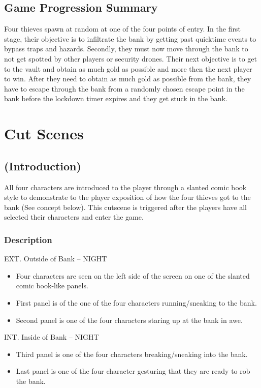 \documentclass[14pt]{report}
\begin{document}
\subsection{Game Progression Summary}

Four thieves spawn at random at one of the four points of entry. In the first stage, their objective is to infiltrate the bank by getting past quicktime events to bypass traps and hazards. Secondly, they must now move through the bank to not get spotted by other players or security drones. 
Their next objective is to get to the vault and obtain as much gold as possible and more then the next player to win. After they need to obtain as much gold as possible from the bank, they have to escape through the bank from a randomly chosen escape point in the bank before the lockdown timer expires and they get stuck in the bank.

\section{Cut Scenes}
\subsection{(Introduction)}

All four characters are introduced to the player through a slanted comic book style to demonstrate to the player exposition of how the four thieves got to the bank (See concept below). This cutscene is triggered after the players have all selected their characters and enter the game.

\subsubsection{Description}

EXT. Outside of Bank -- NIGHT
\begin{itemize}
    \item Four characters are seen on the left side of the screen on one of the slanted comic book-like panels. 
    \item First panel is of the one of the four characters running/sneaking to the bank.
    \item Second panel is one of the four characters staring up at the bank in awe.
\end{itemize}
INT. Inside of Bank -- NIGHT
\begin{itemize}
    \item Third panel is one of the four characters breaking/sneaking into the bank.
    \item Last panel is one of the four character gesturing that they are ready to rob the bank.
\end{itemize}
\end{document}
